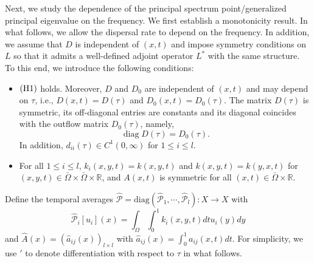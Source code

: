 \documentclass[11pt,reqno]{amsart}
\numberwithin{equation}{section}
\begin{document}
Next, we study the dependence of the principal spectrum point/generalized principal eigenvalue on the frequency.
We first establish a monotonicity result. In what follows, we allow the dispersal rate to depend on the frequency.
In addition, we assume that $D$ is independent of $(x,t)$ and impose symmetry conditions on $L$ so that it admits a well-defined adjoint operator $L^{*}$ with the same structure.
To this end, we introduce the following conditions:
\begin{itemize}[leftmargin=0.9cm]

\item[(F1)]
${\rm (H1) }$ holds.
Moreover, $D$ and $D_{0}$ are independent of $(x,t)$ and may depend on $\tau$, i.e., $D(x,t)=D(\tau)$ and $D_{0}(x,t)=D_{0}(\tau)$. The matrix $D(\tau)$ is symmetric, its off-diagonal entries are constants and its diagonal coincides with the outflow matrix $D_{0}(\tau)$, namely,
\begin{equation*}
\operatorname{diag} D(\tau)
 =  D_{0}(\tau).
\end{equation*}
In addition, $d_{ii}(\tau) \in C^{1}(0,\infty)$ for $ 1\le i\le l$.



\item[(F2)]
For all $1\leq i \leq l$,
$k_{i}(x,y,t) = k(x,y,t)$ and $k(x,y,t) = k(y,x,t)$ for $(x,y,t)\in \bar{\Omega}\times\bar{\Omega}\times\mathbb{R}$, and
$A(x,t)$ is symmetric for all $(x,t)\in\bar{\Omega}\times\mathbb{R}$.
\end{itemize}

Define the temporal averages
$\hat{\mathcal{P}} = \text{diag} (\hat{\mathcal{P}}_{1},  \cdots, \hat{\mathcal{P}}_{l}) : X \to X$  with
$$\hat{\mathcal{P}}_{i}[u_{i}](x) = \int_{\Omega} \int_{0}^{1} k_{i}(x,y,t)dt u_{i}(y) dy $$
and
$\hat{A}(x) = (\hat{a}_{ij}(x))_{l\times l}$ with $ \hat{a}_{ij}(x) = \int_{0}^{1} a_{ij}(x,t)dt$.
For simplicity, we use $'$ to denote differentiation with respect to $\tau$ in what follows.
\end{document}
